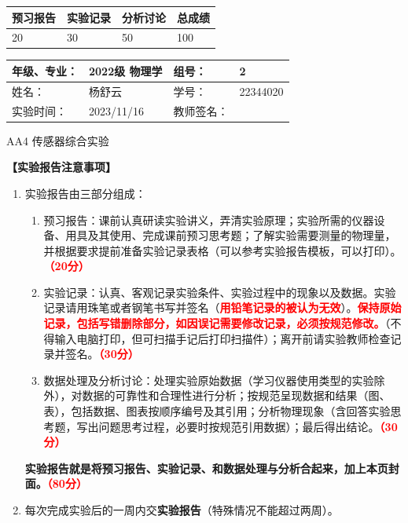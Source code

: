 \documentclass[dvipsnames, svgnames,a4paper,11pt]{article}
\begin{document}
	
	
	
	\begin{table}
		\renewcommand\arraystretch{1.7}
		\begin{tabularx}{\textwidth}{
				|X|X|X|X
				|X|X|X|X|}
			\hline
			\multicolumn{2}{|c|}{预习报告}&\multicolumn{2}{|c|}{实验记录}&\multicolumn{2}{|c|}{分析讨论}&\multicolumn{2}{|c|}{总成绩}\\
			\hline
			\LARGE20 & & \LARGE30 & & \LARGE50 & & \LARGE100 & \\
			\hline
		\end{tabularx}
	\end{table}
	
	\begin{table}
		\renewcommand\arraystretch{1.7}
		\begin{tabularx}{\textwidth}{|X|X|X|X|}
			\hline
			年级、专业： & 2022级 物理学 &组号： & 2\\
			\hline
			姓名： & 杨舒云  & 学号： & 22344020\\
			\hline
			实验时间： & 2023/11/16 & 教师签名： & \\
			\hline
		\end{tabularx}
	\end{table}
	
	\begin{center}
		\LARGE AA4 \quad 传感器综合实验
	\end{center}
	
	\textbf{【实验报告注意事项】}
	\begin{enumerate}
		\item 实验报告由三部分组成：
		\begin{enumerate}
			\item 预习报告：课前认真研读实验讲义，弄清实验原理；实验所需的仪器设备、用具及其使用、完成课前预习思考题；了解实验需要测量的物理量，并根据要求提前准备实验记录表格（可以参考实验报告模板，可以打印）。\textcolor{red}{\textbf{（20分）}}
			\item 实验记录：认真、客观记录实验条件、实验过程中的现象以及数据。实验记录请用珠笔或者钢笔书写并签名（\textcolor{red}{\textbf{用铅笔记录的被认为无效}}）。\textcolor{red}{\textbf{保持原始记录，包括写错删除部分，如因误记需要修改记录，必须按规范修改。}}（不得输入电脑打印，但可扫描手记后打印扫描件）；离开前请实验教师检查记录并签名。\textcolor{red}{\textbf{（30分）}}
			\item 数据处理及分析讨论：处理实验原始数据（学习仪器使用类型的实验除外），对数据的可靠性和合理性进行分析；按规范呈现数据和结果（图、表），包括数据、图表按顺序编号及其引用；分析物理现象（含回答实验思考题，写出问题思考过程，必要时按规范引用数据）；最后得出结论。\textcolor{red}{\textbf{（30分）}}
		\end{enumerate}
		\textbf{实验报告就是将预习报告、实验记录、和数据处理与分析合起来，加上本页封面。\textcolor{red}{（80分）}}
		\item 每次完成实验后的一周内交\textbf{实验报告}（特殊情况不能超过两周）。
	\end{enumerate}
	
\end{document}
